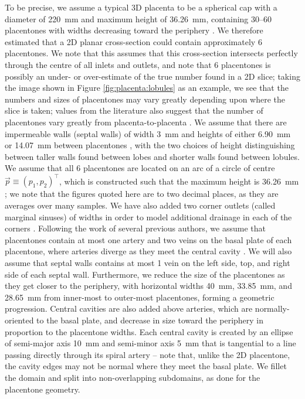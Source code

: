             To be precise, we assume a typical 3D placenta to be a spherical cap with a diameter of \qty{220}{\milli\meter} and maximum height of \qty{36.26}{\milli\meter}, containing $30$--$60$ placentones with widths decreasing toward the periphery \cite{benirschkePathologyHumanPlacenta2012,afrakhtehCorrelationPlacentalThickness2013,kaufmannPlacentalVascularizationBlood1988}. We therefore estimated that a 2D planar cross-section could contain approximately 6 placentones. We note that this assumes that this cross-section intersects perfectly through the centre of all inlets and outlets, and note that 6 placentones is possibly an under- or over-estimate of the true number found in a 2D slice; taking the image shown in Figure \ref{fig:placenta:lobules} as an example, we see that the numbers and sizes of placentones may vary greatly depending upon where the slice is taken; values from the literature also suggest that the number of placentones vary greatly from placenta-to-placenta \cite{benirschkePathologyHumanPlacenta2012,kaufmannPlacentalVascularizationBlood1988,serovOptimalVilliDensity2015}. We assume that there are impermeable walls (septal walls) of width \qty{3}{\milli\meter} and heights of either \qty{6.90}{\milli\meter} or \qty{14.07}{\milli\meter} between placentones \cite{AMANITIS2023e68}, with the two choices of height distinguishing between taller walls found between lobes and shorter walls found between lobules. We assume that all 6 placentones are located on an arc of a circle of centre $\vec{p} \equiv (p_1, p_2)^\intercal$, which is constructed such that the maximum height is \qty{36.26}{\milli\meter} \cite{afrakhtehCorrelationPlacentalThickness2013}; we note that the figures quoted here are to two decimal places, as they are averages over many samples. We have also added two corner outlets (called marginal sinuses) of widths  in order to model additional drainage in each of the corners \cite{nanaevHumanPlacentaEncircled2000}. Following the work of several previous authors, we assume that placentones contain at most one artery and two veins on the basal plate of each placentone, where arteries diverge as they meet the central cavity \cite{chernyavskyMathematicalModelIntervillous2010,lecarpentierComputationalFluidDynamic2016,burtonRheologicalPhysiologicalConsequences2009}. We will also assume that septal walls contains at most 1 vein on the left side, top, and right side of each septal wall. Furthermore, we reduce the size of the placentones as they get closer to the periphery, with horizontal widths \qty{40}{\milli\meter}, \qty{33.85}{\milli\meter}, and \qty{28.65}{\milli\meter} from inner-most to outer-most placentones, forming a geometric progression. Central cavities are also added above arteries, which are normally-oriented to the basal plate, and decrease in size toward the periphery in proportion to the placentone widths. Each central cavity is created by an ellipse of semi-major axis \qty{10}{\milli\meter} and semi-minor axis \qty{5}{\milli\meter} that is tangential to a line passing directly through its spiral artery -- note that, unlike the 2D placentone, the cavity edges may not be normal where they meet the basal plate. We fillet the domain and split into non-overlapping subdomains, as done for the placentone geometry. 